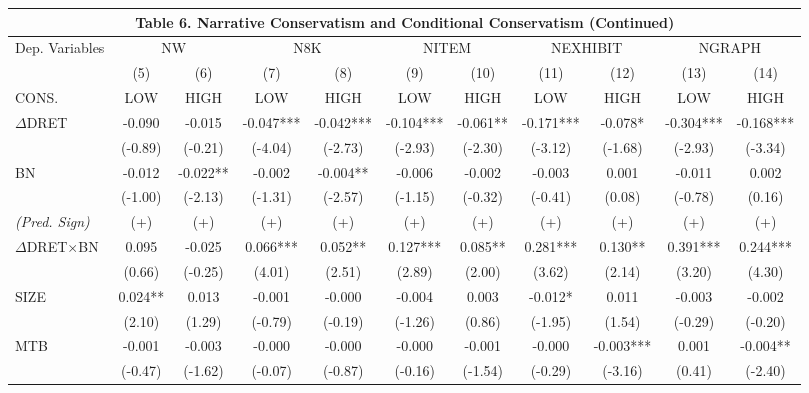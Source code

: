 \begin{table}
	\begin{center}
		\tabcolsep=0.11cm
		\begin{tabular}{lcccccccccc}
			\multicolumn{11}{c}{\textbf{Table 6. Narrative Conservatism and Conditional Conservatism (Continued)}} \\
			\toprule
			\toprule
			Dep. Variables & \multicolumn{2}{c}{NW} & \multicolumn{2}{c}{N8K} & \multicolumn{2}{c}{NITEM} & \multicolumn{2}{c}{NEXHIBIT} & \multicolumn{2}{c}{NGRAPH} \\
			\cmidrule{2-11}
			& (5) & (6) & (7) & (8) & (9) & (10) & (11) & (12) & (13) & (14) \\
			CONS. & LOW & HIGH & LOW & HIGH & LOW & HIGH & LOW & HIGH& LOW & HIGH\\
			\midrule
			$\Delta$DRET & -0.090 & -0.015 & -0.047*** & -0.042*** & -0.104*** & -0.061** & -0.171*** & -0.078* & -0.304*** & -0.168*** \\
			& (-0.89) & (-0.21) & (-4.04) & (-2.73) & (-2.93) & (-2.30) & (-3.12) & (-1.68) & (-2.93) & (-3.34) \\
			BN & -0.012 & -0.022** & -0.002 & -0.004** & -0.006 & -0.002 & -0.003 & 0.001 & -0.011 & 0.002 \\
			& (-1.00) & (-2.13) & (-1.31) & (-2.57) & (-1.15) & (-0.32) & (-0.41) & (0.08) & (-0.78) & (0.16) \\
			\rowcolor[rgb]{ .906,  .902,  .902} \textit{(Pred. Sign)} & (+) & (+) & (+) & (+) & (+) & (+) & (+) & (+) & (+) & (+) \\
			\rowcolor[rgb]{ .906,  .902,  .902} $\Delta$DRET$\times$BN & 0.095 & -0.025 & 0.066*** & 0.052** & 0.127*** & 0.085** & 0.281*** & 0.130** & 0.391*** & 0.244*** \\
			\rowcolor[rgb]{ .906,  .902,  .902} & (0.66) & (-0.25) & (4.01) & (2.51) & (2.89) & (2.00) & (3.62) & (2.14) & (3.20) & (4.30) \\
			SIZE & 0.024** & 0.013 & -0.001 & -0.000 & -0.004 & 0.003 & -0.012* & 0.011 & -0.003 & -0.002 \\
			& (2.10) & (1.29) & (-0.79) & (-0.19) & (-1.26) & (0.86) & (-1.95) & (1.54) & (-0.29) & (-0.20) \\
			MTB & -0.001 & -0.003 & -0.000 & -0.000 & -0.000 & -0.001 & -0.000 & -0.003*** & 0.001 & -0.004** \\
			& (-0.47) & (-1.62) & (-0.07) & (-0.87) & (-0.16) & (-1.54) & (-0.29) & (-3.16) & (0.41) & (-2.40) \\

\end{tabular}
\end{center}
\end{table}
